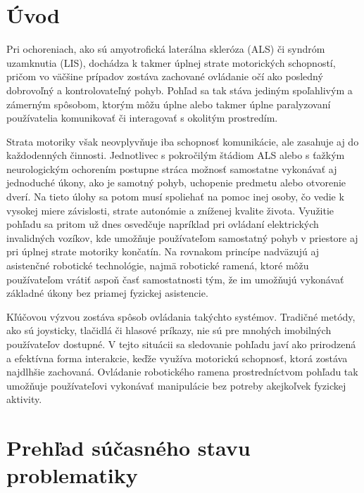\documentclass[11pt,english,a4paper]{article}
\begin{document}

\tableofcontents

\newpage
\headheight  14pt

\section{Úvod}  \label{sec:intro}
  
Pri  ochoreniach,  ako  sú  amyotrofická  laterálna  skleróza  (ALS)\cite{ALS}  či  syndróm  uzamknutia  (LIS)\cite{LIS},  dochádza  k  takmer  úplnej  strate  motorických  schopností,  pričom  vo  väčšine  prípadov  zostáva  zachované  ovládanie  očí  ako  posledný  dobrovoľný  a  kontrolovateľný  pohyb.  Pohľad  sa  tak  stáva  jediným  spoľahlivým  a  zámerným  spôsobom,  ktorým  môžu  úplne  alebo  takmer  úplne  paralyzovaní  používatelia  komunikovať  či  interagovať  s  okolitým  prostredím.

Strata  motoriky  však  neovplyvňuje  iba  schopnosť  komunikácie,  ale  zasahuje  aj  do  každodenných  činnosti.  Jednotlivec  s  pokročilým  štádiom  ALS  alebo  s  ťažkým  neurologickým  ochorením  postupne  stráca  možnosť  samostatne  vykonávať  aj  jednoduché  úkony,  ako  je  samotný  pohyb,  uchopenie  predmetu  alebo  otvorenie  dverí.  Na  tieto  úlohy  sa  potom  musí  spoliehať  na  pomoc  inej  osoby,  čo  vedie  k  vysokej  miere  závislosti,  strate  autonómie  a  zníženej  kvalite  života.  Využitie  pohľadu  sa  pritom  už  dnes  osvedčuje  napríklad  pri  ovládaní  elektrických  invalidných  vozíkov,  kde  umožňuje  používateľom  samostatný  pohyb  v  priestore  aj  pri  úplnej  strate  motoriky  končatín.  Na  rovnakom  princípe  nadväzujú  aj  asistenčné  robotické  technológie,  najmä  robotické  ramená,  ktoré  môžu  používateľom  vrátiť  aspoň  časť  samostatnosti  tým,  že  im  umožňujú  vykonávať  základné  úkony  bez  priamej  fyzickej  asistencie.

Kľúčovou  výzvou  zostáva  spôsob  ovládania  takýchto  systémov.  Tradičné  metódy,  ako  sú  joysticky,  tlačidlá  či  hlasové  príkazy,  nie  sú  pre  mnohých  imobilných  používateľov  dostupné.  V  tejto  situácii  sa  sledovanie  pohľadu  javí  ako  prirodzená  a  efektívna  forma  interakcie,  keďže  využíva  motorickú  schopnosť,  ktorá  zostáva  najdlhšie  zachovaná.  Ovládanie  robotického  ramena  prostredníctvom  pohľadu  tak  umožňuje  používateľovi  vykonávať  manipulácie  bez  potreby  akejkoľvek  fyzickej  aktivity.

\section{Prehľad  súčasného  stavu  problematiky}  \label{sec:sota}
\end{document}
